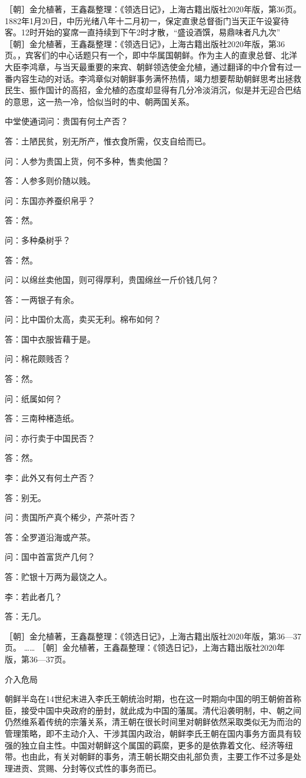 \documentclass[12pt,UTF8]{ctexbook}
\begin{document}
［朝］金允植著，王鑫磊整理：《领选日记》，上海古籍出版社2020年版，第36页。
1882年1月20日，中历光绪八年十二月初一，保定直隶总督衙门当天正午设宴待客。12时开始的宴席一直持续到下午2时才散，“盛设酒馔，易鼎味者凡九次” ［朝］金允植著，王鑫磊整理：《领选日记》，上海古籍出版社2020年版，第36页。，宾客们的中心话题只有一个，即中华属国朝鲜。作为主人的直隶总督、北洋大臣李鸿章，与当天最重要的来宾、朝鲜领选使金允植，通过翻译的中介曾有过一番内容生动的对话。李鸿章似对朝鲜事务满怀热情，竭力想要帮助朝鲜思考出拯救民生、振作国计的高招，金允植的态度却显得有几分冷淡消沉，似是并无迎合巴结的意思，这一热一冷，恰似当时的中、朝两国关系。

中堂使通词问：贵国有何土产否？

答：土陋民贫，别无所产，惟衣食所需，仅支自给而已。

问：人参为贵国上货，何不多种，售卖他国？

答：人参多则价随以贱。

问：东国亦养蚕织帛乎？

答：然。

问：多种桑树乎？

答：然。

问：以绵丝卖他国，则可得厚利，贵国绵丝一斤价钱几何？

答：一两银子有余。

问：比中国价太高，卖买无利。棉布如何？

答：国中衣服皆藉于是。

问：棉花颇贱否？

答：然。

问：纸属如何？

答：三南种楮造纸。

问：亦行卖于中国民否？

答：然。

李：此外又有何土产否？

答：别无。

问：贵国所产真个稀少，产茶叶否？

答：全罗道沿海或产茶。

问：国中首富货产几何？

答：贮银十万两为最饶之人。

李：若此者几？

答：无几。

［朝］金允植著，王鑫磊整理：《领选日记》，上海古籍出版社2020年版，第36—37页。
…… ［朝］金允植著，王鑫磊整理：《领选日记》，上海古籍出版社2020年版，第36—37页。

介入危局

朝鲜半岛在14世纪末进入李氏王朝统治时期，也在这一时期向中国的明王朝俯首称臣，接受中国中央政府的册封，就此成为中国的藩属。清代沿袭明制，中、朝之间仍然维系着传统的宗藩关系，清王朝在很长时间里对朝鲜依然采取类似无为而治的管理策略，即不主动介入、干涉其国内政治，朝鲜李氏王朝在国内事务方面具有较强的独立自主性。中国对朝鲜这个属国的羁縻，更多的是依靠着文化、经济等纽带。也由此，有关对朝鲜的事务，清王朝长期交由礼部负责，主要工作不过多是处理进贡、赏赐、分封等仪式性的事务而已。
\end{document}
